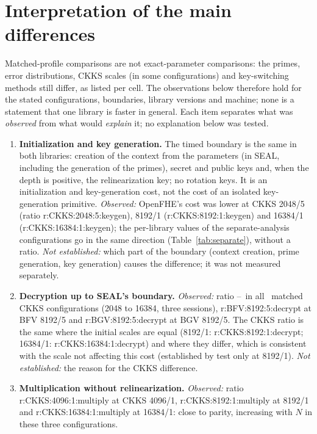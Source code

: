 \documentclass[11pt]{article}
\newcommand{\R}[1]{\csname r:#1\endcsname}   %
\begin{document}
\clearpage
\section{Interpretation of the main differences}
\label{sec:interp}

Matched-profile comparisons are not exact-parameter comparisons: the primes, error distributions, CKKS scales (in some configurations) and key-switching methods still differ, as listed per cell. The observations below therefore hold for the stated configurations, boundaries, library versions and machine; none is a statement that one library is faster in general. Each item separates what was \emph{observed} from what would \emph{explain} it; no explanation below was tested.

\begin{enumerate}[leftmargin=*, itemsep=3pt]
  \item \textbf{Initialization and key generation.} The timed boundary is the same in both libraries: creation of the context from the parameters (in SEAL, including the generation of the primes), secret and public keys and, when the depth is positive, the relinearization key; no rotation keys. It is an initialization and key-generation cost, not the cost of an isolated key-generation primitive. \emph{Observed:} OpenFHE's cost was lower at CKKS 2048/5 (ratio \R{CKKS:2048:5:keygen}), 8192/1 (\R{CKKS:8192:1:keygen}) and 16384/1 (\R{CKKS:16384:1:keygen}); the per-library values of the separate-analysis configurations go in the same direction (Table~\ref{tab:separate}), without a ratio. \emph{Not established:} which part of the boundary (context creation, prime generation, key generation) causes the difference; it was not measured separately.
  \item \textbf{Decryption up to SEAL's boundary.} \emph{Observed:} ratio \ratioMinckksdecrypt--\ratioMaxckksdecrypt\ in all \ratioNckksdecrypt\ matched CKKS configurations (2048 to 16384, three sessions), \R{BFV:8192:5:decrypt} at BFV 8192/5 and \R{BGV:8192:5:decrypt} at BGV 8192/5. The CKKS ratio is the same where the initial scales are equal (8192/1: \R{CKKS:8192:1:decrypt}; 16384/1: \R{CKKS:16384:1:decrypt}) and where they differ, which is consistent with the scale not affecting this cost (established by test only at 8192/1). \emph{Not established:} the reason for the CKKS difference.
  \item \textbf{Multiplication without relinearization.} \emph{Observed:} ratio \R{CKKS:4096:1:multiply} at CKKS 4096/1, \R{CKKS:8192:1:multiply} at 8192/1 and \R{CKKS:16384:1:multiply} at 16384/1: close to parity, increasing with $N$ in these three configurations.

\end{enumerate}
\end{document}
